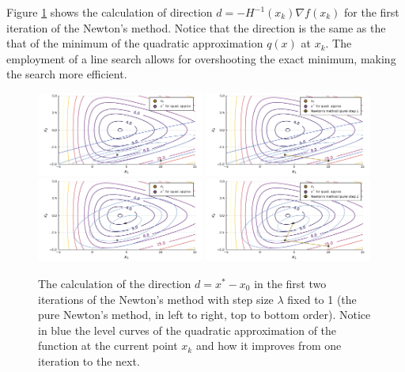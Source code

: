 Figure \ref{fig:newton_method_exp} shows the calculation of direction $d = - H^{-1}(x_k)\nabla f(x_k)$ for the first iteration of the Newton's method. Notice that the direction is the same as the that of the minimum of the quadratic approximation $q(x)$ at $x_k$. The employment of a line search allows for overshooting the exact minimum, making the search more efficient.
%
\begin{figure}[H]
    \includegraphics[width=0.49\textwidth]{part_2/chapter_5/figures/newton_path1.pdf}	
	\includegraphics[width=0.49\textwidth]{part_2/chapter_5/figures/newton_path2.pdf}
	\includegraphics[width=0.49\textwidth]{part_2/chapter_5/figures/newton_path3.pdf}
	\includegraphics[width=0.49\textwidth]{part_2/chapter_5/figures/newton_path4.pdf}
	\caption{The calculation of the direction $d = x^* - x_0$ in the first two iterations of the Newton's method with step size $\lambda$ fixed to 1 (the pure Newton's method, in left to right, top to bottom order). Notice in blue the level curves of the quadratic approximation of the function at the current point $x_k$ and how it improves from one iteration to the next.} \label{fig:newton_method_exp}
\end{figure}
%

